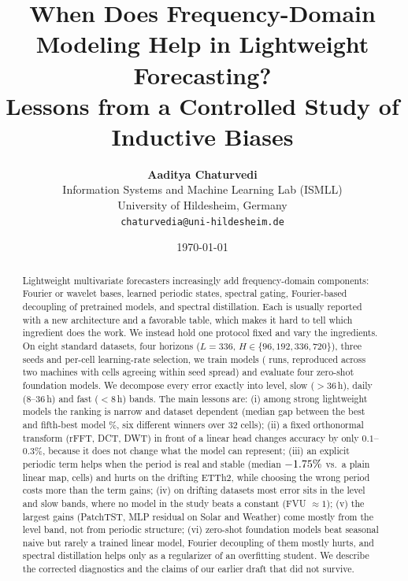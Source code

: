 \documentclass[11pt,a4paper]{article}
\title{\textbf{When Does Frequency-Domain Modeling Help in Lightweight Forecasting?\\Lessons from a Controlled Study of Inductive Biases}}
\author{
    \textbf{Aaditya Chaturvedi}\\
    Information Systems and Machine Learning Lab (ISMLL)\\
    University of Hildesheim, Germany\\
    \texttt{chaturvedia@uni-hildesheim.de}
}
\date{\today}
\begin{document}
\maketitle

\begin{abstract}
Lightweight multivariate forecasters increasingly add frequency-domain components: Fourier or wavelet bases, learned periodic states, spectral gating, Fourier-based decoupling of pretrained models, and spectral distillation. Each is usually reported with a new architecture and a favorable table, which makes it hard to tell which ingredient does the work. We instead hold one protocol fixed and vary the ingredients. On eight standard datasets, four horizons ($L{=}336$, $H\in\{96,192,336,720\}$), three seeds and per-cell learning-rate selection, we train \nTrained{} models (\nRuns{} runs, reproduced across two machines with \xmAgree{} cells agreeing within seed spread) and evaluate four zero-shot foundation models. We decompose every error exactly into level, slow ($>$36\,h), daily (8--36\,h) and fast ($<$8\,h) bands. The main lessons are: (i) among strong lightweight models the ranking is narrow and dataset dependent (median gap between the best and fifth-best model \medGapFifth\%, six different winners over 32 cells); (ii) a fixed orthonormal transform (rFFT, DCT, DWT) in front of a linear head changes accuracy by only $0.1$--$0.3\%$, because it does not change what the model can represent; (iii) an explicit periodic term helps when the period is real and stable (median $-1.75\%$ vs.\ a plain linear map, \cmpCycLinCIvsLinearwins{} cells) and hurts on the drifting ETTh2, while choosing the wrong period costs more than the term gains; (iv) on drifting datasets most error sits in the level and slow bands, where no model in the study beats a constant (FVU $\approx 1$); (v) the largest gains (PatchTST, MLP residual on Solar and Weather) come mostly from the level band, not from periodic structure; (vi) zero-shot foundation models beat seasonal naive but rarely a trained linear model, Fourier decoupling of them mostly hurts, and spectral distillation helps only as a regularizer of an overfitting student. We describe the corrected diagnostics and the claims of our earlier draft that did not survive.
\end{abstract}
\end{document}
